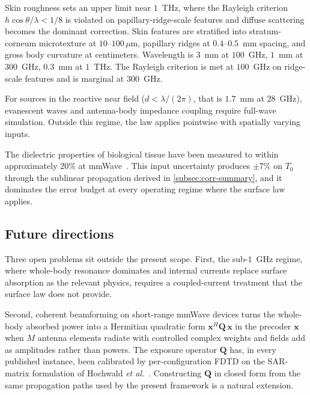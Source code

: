 \documentclass[journal,twocolumn,10pt]{IEEEtran}
\theoremstyle{plain}
\theoremstyle{remark}
\begin{document}
Skin roughness sets an upper limit near $1$~THz, where the Rayleigh
criterion $h\cos\theta/\lambda < 1/8$ is violated on
papillary-ridge-scale features and diffuse scattering becomes the
dominant correction. Skin features are stratified into
stratum-corneum microtexture at $10$--$100\,\mu$m, papillary ridges
at $0.4$--$0.5$~mm spacing, and gross body curvature at centimeters.
Wavelength is $3$~mm at $100$~GHz, $1$~mm at $300$~GHz, $0.3$~mm at
$1$~THz. The Rayleigh criterion is met at $100$~GHz on ridge-scale
features and is marginal at $300$~GHz.

For sources in the reactive near field ($d < \lambda/(2\pi)$, that is
$1.7$~mm at $28$~GHz), evanescent waves and antenna-body impedance
coupling require full-wave simulation. Outside this regime, the law
applies pointwise with spatially varying inputs.

The dielectric properties of biological tissue have been measured to
within approximately $20\%$ at mmWave~\cite{AlekseevZiskin2007}. This
input uncertainty produces $\pm 7\%$ on $T_0$ through the sublinear
propagation derived in \cref{subsec:corr-summary}, and it dominates
the error budget at every operating regime where the surface law
applies.

\subsection{Future directions}\label{subsec:disc-future}

Three open problems sit outside the present scope. First, the
sub-$1$~GHz regime, where whole-body resonance dominates and internal
currents replace surface absorption as the relevant physics, requires
a coupled-current treatment that the surface law does not provide.

Second, coherent beamforming on short-range mmWave devices turns the
whole-body absorbed power into a Hermitian quadratic form
$\mathbf{x}^H \mathbf{Q}\,\mathbf{x}$ in the precoder $\mathbf{x}$
when $M$ antenna elements radiate with controlled complex weights and
fields add as amplitudes rather than powers. The exposure operator
$\mathbf{Q}$ has, in every published instance, been calibrated by
per-configuration FDTD on the SAR-matrix formulation of Hochwald
\textit{et al.}~\cite{Hochwald2014}. Constructing $\mathbf{Q}$ in
closed form from the same propagation paths used by the present
framework is a natural extension.
\end{document}
